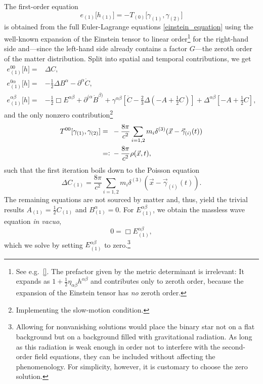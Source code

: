 The first-order equation
\begin{equation}
  e_{(1)}\lbrack h_{(1)}\rbrack = -T_{(0)}\lbrack\gamma_{(1)},\gamma_{(2)}\rbrack
\end{equation}
is obtained from the full Euler-Lagrange equations \eqref{einstein_equation} using the well-known expansion of the Einstein tensor to linear order\footnote{See e.g.~\ref{}. The prefactor given by the metric determinant is irrelevant: It expands as $1 + \frac{1}{2}\eta_{\alpha\beta} h^{\alpha\beta}$ and contributes only to zeroth order, because the expansion of the Einstein tensor has \emph{no} zeroth order.} for the right-hand side and---since the left-hand side already contains a factor $G$---the zeroth order of the matter distribution. Split into spatial and temporal contributions, we get
\begin{equation}\label{three_plus_one_metric_lhs}
  \begin{aligned}
    e^{00}_{(1)}\lbrack h\rbrack = {} & \Delta C, \\
    e^{0\alpha}_{(1)}\lbrack h\rbrack = {} & -\frac{1}{2} \Delta B^\alpha - \partial^\alpha \dot C, \\
    e^{\alpha\beta}_{(1)}\lbrack h\rbrack = {} & -\frac{1}{2} \Box E^{\alpha\beta} + \partial^{(\alpha} \dot B^{\beta)} + \gamma^{\alpha\beta}\left\lbrack \ddot C - \frac{2}{3}\Delta(-A + \frac{1}{2} C)\right\rbrack + \Delta^{\alpha\beta}\left\lbrack -A + \frac{1}{2} C\right\rbrack,
  \end{aligned}
\end{equation}
and the only nonzero contribution\footnote{Implementing the slow-motion condition.}
\begin{equation}
  \begin{aligned}
    T^{00}\lbrack\gamma_{(1)},\gamma_{(2)}\rbrack =\hphantom{\vcentcolon} {} & -\frac{8\pi}{c^2}\sum_{i=1,2}m_i\delta^{(3)}(\vec x-\vec \gamma_{(i)}(t)) \\
    =\vcentcolon {} & -\frac{8\pi}{c^2} \rho(\vec x,t),
  \end{aligned}
\end{equation}
such that the first iteration boils down to the Poisson equation
\begin{equation}\label{poisson_equation}
  \Delta C_{(1)} = \frac{8\pi}{c^2}\sum_{i=1,2}m_i\delta^{(3)}(\vec x-\vec \gamma_{(i)}(t)).
\end{equation}
The remaining equations are not sourced by matter and, thus, yield the trivial results $A_{(1)} = \frac{1}{2} C_{(1)}$ and $B_{(1)}^\alpha = 0$. For $E_{(1)}^{\alpha\beta}$, we obtain the massless wave equation \emph{in vacuo},
\begin{equation}
  0 = \Box E_{(1)}^{\alpha\beta},
\end{equation}
which we solve by setting $E_{(1)}^{\alpha\beta}$ to zero.\footnote{Allowing for nonvanishing solutions would place the binary star not on a flat background but on a background filled with gravitational radiation. As long as this radiation is weak enough in order not to interfere with the second-order field equations, they can be included without affecting the phenomenology. For simplicity, however, it is customary to choose the zero solution.}

